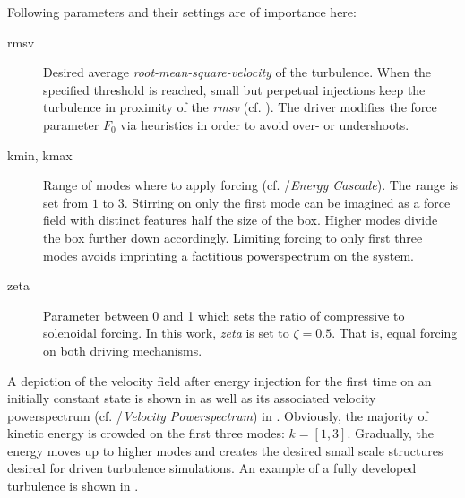 Following parameters and their settings are of importance here:

\begin{description}
    \item [rmsv] Desired average \emph{root-mean-square-velocity} of the turbulence. When the
            specified threshold is reached, small but perpetual injections keep the turbulence
            in proximity of the \emph{rmsv} (cf. ). The driver modifies
            the force parameter $F_0$ via heuristics in order to avoid over- or undershoots.
    \item [kmin, kmax] Range of modes where to apply forcing (cf.
        /\emph{Energy Cascade}). The range is set from $1$ to
        $3$. Stirring on only the first mode can be imagined as a force field with
        distinct features half the size of the box. Higher modes divide the box further
        down accordingly. Limiting forcing to only first three modes avoids imprinting
        a factitious powerspectrum on the system.
    \item [zeta] Parameter between 0 and 1 which sets the ratio of compressive
        to solenoidal forcing. In this work, \emph{zeta} is set to $\zeta = 0.5$. That
        is, equal forcing on both driving mechanisms.
\end{description}

A depiction of the velocity field after energy injection for the first time on
an initially constant state is shown in
 as well as its associated velocity
powerspectrum (cf. /\emph{Velocity Powerspectrum}) in
.  Obviously, the majority of kinetic energy
is crowded on the first three modes: $k = [1,3]$. Gradually, the energy moves
up to higher modes and creates the desired small scale structures desired for
driven turbulence simulations. An example of a fully developed turbulence
is shown in .
